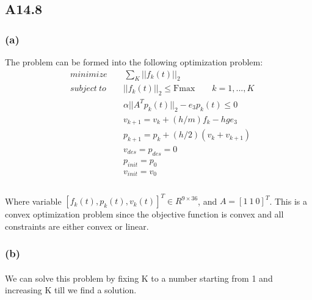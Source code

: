 \subsection*{A14.8}
\subsubsection*{(a)}
The problem can be formed into the following optimization problem:
\begin{align*}
&minimize \qquad \sum_{K}||f_k(t)||_2 \\
&subject \ to \qquad   ||f_k(t)||_2 \leq \text{Fmax} \qquad k =1,...,K\\
&\qquad \qquad \qquad \ \alpha||A^Tp_k(t)||_2 -e_3p_k(t) \leq 0 \\
&\qquad \qquad \qquad \ v_{k+1} =v_k +(h/m)f_k -hge_3 \\
&\qquad \qquad \qquad \ p_{k+1} =p_k + (h/2) (v_k +v_{k+1})\\
&\qquad \qquad \qquad \ v_{des} =p_{des} = 0 \\
&\qquad \qquad \qquad \ p_{init} = p_0 \\
&\qquad \qquad \qquad \ v_{init} = v_0 \\
\end{align*}  
\paragraph{}
Where variable $[f_k(t), p_k(t), v_k(t)]^T \in R^{9\times36}$, and $A = [1\ 1\ 0]^T$. This is a convex optimization problem since the objective function is convex and all constraints are either convex or linear.
\subsubsection*{(b)}
\paragraph{}
We can solve this problem by fixing K to a number starting from 1 and increasing K till we find a solution.
